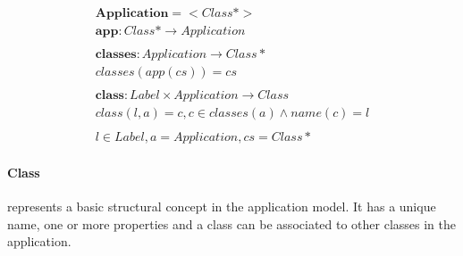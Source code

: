 \documentclass[11pt]{article}
\begin{document}
\begin{align*}
  \mathbf{Application} = < Class* > \\ 
  \mathbf{app} : Class* \rightarrow  Application \\ \\
  \mathbf{classes} : Application \rightarrow Class* \\
  classes(app(cs)) = cs  \\\\
  \mathbf{class} : Label \times Application \rightarrow Class   \\ 
  class(l, a) = c, c \in classes(a) \wedge name(c) = l \\ \\
  l \in Label, a = Application, cs = Class* 
\end{align*}


\paragraph{Class} represents a basic structural concept in the application model. It has a unique name, one or more properties and a class can be associated to other classes in the application. 
\end{document}
